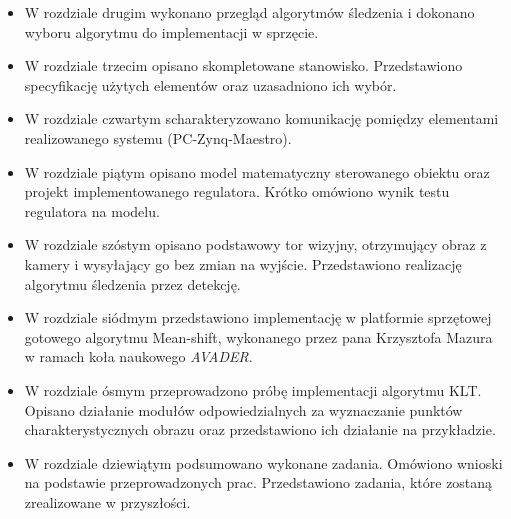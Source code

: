 \begin{itemize}
\item W rozdziale drugim wykonano przegląd algorytmów śledzenia i dokonano wyboru algorytmu do implementacji w sprzęcie.
\item W rozdziale trzecim opisano skompletowane stanowisko. Przedstawiono specyfikację użytych elementów oraz uzasadniono ich wybór.
\item W rozdziale czwartym scharakteryzowano komunikację pomiędzy elementami realizowanego systemu (PC-Zynq-Maestro).
\item W rozdziale piątym opisano model matematyczny sterowanego obiektu oraz projekt implementowanego regulatora. Krótko omówiono wynik testu regulatora na modelu.
\item W rozdziale szóstym opisano podstawowy tor wizyjny, otrzymujący obraz z kamery i wysyłający go bez zmian na wyjście. Przedstawiono realizację algorytmu śledzenia przez detekcję.
\item W rozdziale siódmym przedstawiono implementację w platformie sprzętowej gotowego algorytmu Mean-shift, wykonanego przez pana Krzysztofa Mazura w ramach koła naukowego \textit{AVADER}.
\item W rozdziale ósmym przeprowadzono próbę implementacji algorytmu KLT. Opisano działanie modułów odpowiedzialnych za wyznaczanie punktów charakterystycznych obrazu oraz przedstawiono ich działanie na przykładzie.
\item W rozdziale dziewiątym podsumowano wykonane zadania. Omówiono wnioski na podstawie przeprowadzonych prac. Przedstawiono zadania, które zostaną zrealizowane w przyszłości.
\end{itemize}